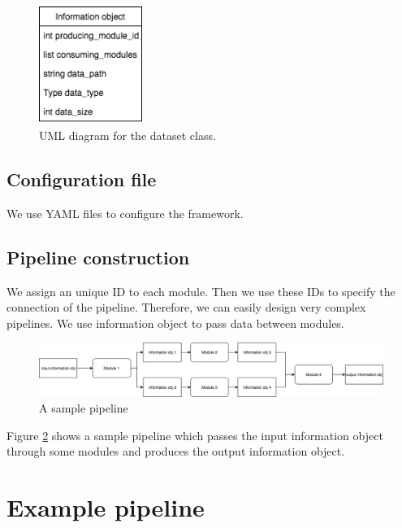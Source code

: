 \documentclass{article}
\begin{document}
    \begin{figure}[H]
        \begin{center}
            \includegraphics[width=0.3\textwidth]{fig/dataset_uml.png}
        \end{center}
        \label{fig:dataset_uml}
        \caption{UML diagram for the dataset class.}
    \end{figure}

    \subsection{Configuration file}
    We use YAML files to configure the framework.

    \subsection{Pipeline construction}
    We assign an unique ID to each module.
    Then we use these IDs to specify the connection of the pipeline.
    Therefore, we can easily design very complex pipelines.
    We use information object to pass data between modules.

    \begin{figure}[H]
        \begin{center}
            \includegraphics[width=1.2\textwidth]{fig/sample_pipeline.png}
        \end{center}
        \label{fig:sample_pipeline}
        \caption{A sample pipeline}
    \end{figure}
    Figure \ref{fig:sample_pipeline} shows a sample pipeline which passes the input information object
    through some modules and produces the output information object.


\section{Example pipeline}
\end{document}
